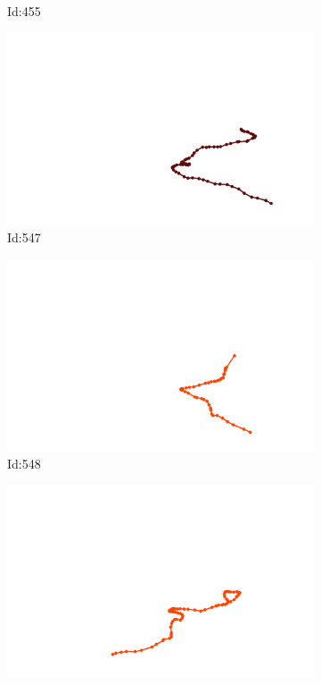 \documentclass[12pt,twoside]{report}
\begin{document}
\begin{figure}
\begin{subfigure}[b]{0.20\textwidth}
\caption{Id:455}
\end{subfigure}
\begin{subfigure}[b]{0.20\textwidth}
\centering
\includegraphics[width=\textwidth]{../trajectories/547.png}
\caption{Id:547}
\end{subfigure}
\begin{subfigure}[b]{0.20\textwidth}
\centering
\includegraphics[width=\textwidth]{../trajectories/548.png}
\caption{Id:548}
\end{subfigure}
\begin{subfigure}[b]{0.20\textwidth}
\centering
\includegraphics[width=\textwidth]{../trajectories/569.png}

\end{subfigure}
\end{figure}
\end{document}
